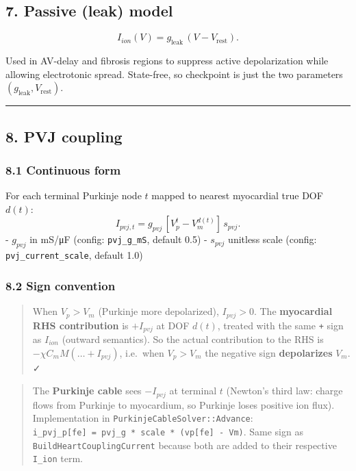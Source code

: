 \documentclass[
  11pt,
]{article}
\begin{document}
\hypertarget{passive-leak-model}{%
\subsection{7. Passive (leak) model}\label{passive-leak-model}}

\[I_{ion}(V) = g_\mathrm{leak}\, (V - V_\mathrm{rest}).\]

Used in AV-delay and fibrosis regions to suppress active depolarization
while allowing electrotonic spread. State-free, so checkpoint is just
the two parameters \((g_\mathrm{leak}, V_\mathrm{rest})\).

\begin{center}\rule{0.5\linewidth}{0.5pt}\end{center}

\hypertarget{pvj-coupling}{%
\subsection{8. PVJ coupling}\label{pvj-coupling}}

\hypertarget{continuous-form-1}{%
\subsubsection{8.1 Continuous form}\label{continuous-form-1}}

For each terminal Purkinje node \(t\) mapped to nearest myocardial true
DOF \(d(t)\): \[I_{pvj,t} = g_{pvj}\, [V_p^t - V_m^{d(t)}]\, s_{pvj}.\]
- \(g_{pvj}\) in mS/μF (config: \texttt{pvj\_g\_mS}, default 0.5) -
\(s_{pvj}\) unitless scale (config: \texttt{pvj\_current\_scale},
default 1.0)

\hypertarget{sign-convention}{%
\subsubsection{8.2 Sign convention}\label{sign-convention}}

\begin{quote}
When \(V_p > V_m\) (Purkinje more depolarized), \(I_{pvj} > 0\). The
\textbf{myocardial RHS contribution} is \(+I_{pvj}\) at DOF \(d(t)\),
treated with the same \texttt{+} sign as \(I_{ion}\) (outward
semantics). So the actual contribution to the RHS is
\(-\chi C_m M (\ldots + I_{pvj})\), i.e.~when \(V_p > V_m\) the negative
sign \textbf{depolarizes} \(V_m\). ✓
\end{quote}

\begin{quote}
The \textbf{Purkinje cable} sees \(-I_{pvj}\) at terminal \(t\)
(Newton's third law: charge flows from Purkinje to myocardium, so
Purkinje loses positive ion flux). Implementation in
\texttt{PurkinjeCableSolver::Advance}:
\texttt{i\_pvj\_p{[}fe{]}\ =\ pvj\_g\ *\ scale\ *\ (vp{[}fe{]}\ -\ Vm)}.
Same sign as \texttt{BuildHeartCouplingCurrent} because both are added
to their respective \texttt{I\_ion} term.
\end{quote}
\end{document}
